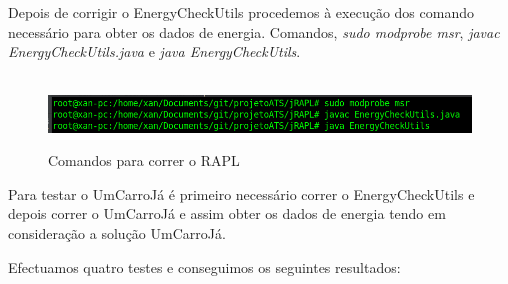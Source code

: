 Depois de corrigir o EnergyCheckUtils procedemos à execução dos comando necessário para obter os dados de energia. Comandos, \textit{sudo modprobe msr}, \textit{javac EnergyCheckUtils.java} e \textit{java EnergyCheckUtils}.

\begin{figure}[H]
    \hbox{\hspace{-8em} \includegraphics[width=1.5\textwidth]{images/rapl_run.png}}
    \label{fig51}
    \caption{Comandos para correr o RAPL}
\end{figure}

Para testar o UmCarroJá é primeiro necessário correr o EnergyCheckUtils e depois correr o UmCarroJá e assim obter os dados de energia tendo em consideração a solução UmCarroJá.

Efectuamos quatro testes e conseguimos os seguintes resultados:

